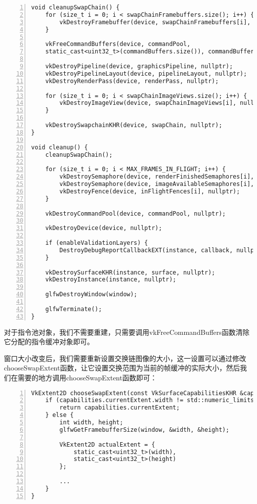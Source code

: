 \documentclass{ctexart}
\begin{document}
\begin{lstlisting}[language={[ANSI]C},keywordstyle=\color{blue!70},commentstyle=\color{red!50!green!50!blue!50},frame=shadowbox, rulesepcolor=\color{red!20!green!20!blue!20},basicstyle=\small,numbers=left, numberstyle=\tiny,breaklines=true]
void cleanupSwapChain() {
	for (size_t i = 0; i < swapChainFramebuffers.size(); i++) {
		vkDestroyFramebuffer(device, swapChainFramebuffers[i], nullptr);
	}

	vkFreeCommandBuffers(device, commandPool,
	static_cast<uint32_t>(commandBuffers.size()), commandBuffers.data());

	vkDestroyPipeline(device, graphicsPipeline, nullptr);
	vkDestroyPipelineLayout(device, pipelineLayout, nullptr);
	vkDestroyRenderPass(device, renderPass, nullptr);

	for (size_t i = 0; i < swapChainImageViews.size(); i++) {
		vkDestroyImageView(device, swapChainImageViews[i], nullptr);
	}

	vkDestroySwapchainKHR(device, swapChain, nullptr);
}

void cleanup() {
	cleanupSwapChain();

	for (size_t i = 0; i < MAX_FRAMES_IN_FLIGHT; i++) {
		vkDestroySemaphore(device, renderFinishedSemaphores[i], nullptr);
		vkDestroySemaphore(device, imageAvailableSemaphores[i], nullptr);
		vkDestroyFence(device, inFlightFences[i], nullptr);
	}

	vkDestroyCommandPool(device, commandPool, nullptr);

	vkDestroyDevice(device, nullptr);

	if (enableValidationLayers) {
		DestroyDebugReportCallbackEXT(instance, callback, nullptr);
	}

	vkDestroySurfaceKHR(instance, surface, nullptr);
	vkDestroyInstance(instance, nullptr);

	glfwDestroyWindow(window);

	glfwTerminate();
}
\end{lstlisting}

对于指令池对象，我们不需要重建，只需要调用vkFreeCommandBuffers函数清除它分配的指令缓冲对象即可。

窗口大小改变后，我们需要重新设置交换链图像的大小，这一设置可以通过修改chooseSwapExtent函数，让它设置交换范围为当前的帧缓冲的实际大小，然后我们在需要的地方调用chooseSwapExtent函数即可：

\begin{lstlisting}[language={[ANSI]C},keywordstyle=\color{blue!70},commentstyle=\color{red!50!green!50!blue!50},frame=shadowbox, rulesepcolor=\color{red!20!green!20!blue!20},basicstyle=\small,numbers=left, numberstyle=\tiny,breaklines=true]
VkExtent2D chooseSwapExtent(const VkSurfaceCapabilitiesKHR &capabilities) {
	if (capabilities.currentExtent.width != std::numeric_limits<uint32_t>::max()) {
		return capabilities.currentExtent;
	} else {
		int width, height;
		glfwGetFramebufferSize(window, &width, &height);

		VkExtent2D actualExtent = {
			static_cast<uint32_t>(width),
			static_cast<uint32_t>(height)
		};

		...
	}
}
\end{lstlisting}
\end{document}
